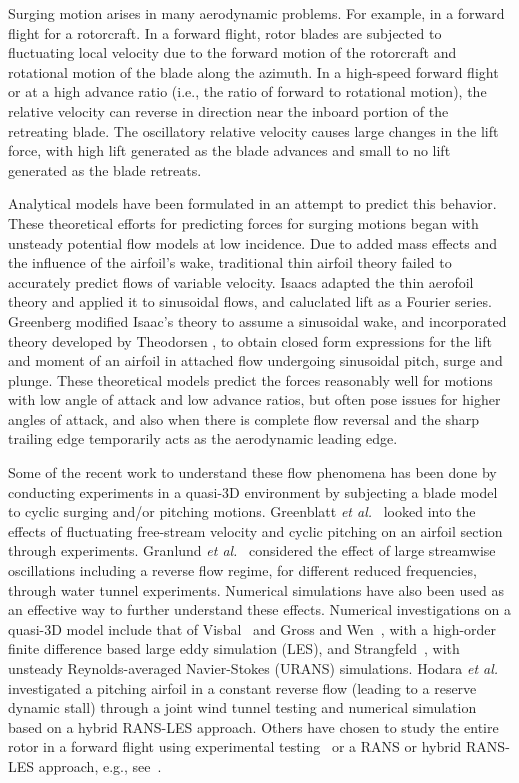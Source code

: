Surging motion arises in many aerodynamic problems.
For example, in a forward flight for a rotorcraft.
In a forward flight, rotor blades are subjected to fluctuating local velocity due to the forward motion of the rotorcraft 
and rotational motion of the blade along the azimuth. 
In a high-speed forward flight or at a high advance ratio (i.e., the ratio of forward to rotational motion), the relative velocity 
can reverse in direction near the inboard portion of the retreating blade.
The oscillatory relative velocity causes large changes in the lift force, with high lift 
generated as the blade advances and small to no lift generated as the blade retreats. 

Analytical models have been formulated in an attempt to predict this behavior. These theoretical efforts for predicting forces for surging motions began with unsteady potential flow models at low incidence. 
Due to added mass effects and the influence of the airfoil’s wake, traditional thin airfoil theory failed to accurately predict flows of variable velocity. 
Isaacs \cite{bib:Isaacs} adapted the thin aerofoil theory and applied it to sinusoidal flows, and caluclated lift as a Fourier series.
Greenberg \cite{bib:Greenberg1947} modified Isaac's theory to assume a sinusoidal wake, and incorporated theory developed by Theodorsen \cite{bib:Theodorsen1934}, to obtain closed form expressions for the lift and moment of an airfoil in attached flow undergoing sinusoidal pitch, surge and plunge. 
These theoretical models predict the forces reasonably well \cite{bib:greenblatt2016} for motions with low angle of attack and low advance ratios, but often pose issues for higher angles of attack, and also when there is complete flow reversal and the sharp trailing edge temporarily acts as the aerodynamic leading edge.

Some of the recent work to understand these flow phenomena has been done by conducting experiments in a quasi-3D environment by subjecting a blade model to cyclic surging and/or pitching motions.
Greenblatt \textit{et al.}~\cite{bib:greenblatt2016} looked into the effects of fluctuating free-stream velocity and cyclic pitching on an airfoil section through experiments.
Granlund \textit{et al.}~\cite{bib:granlund2016} considered the effect of large streamwise oscillations including a reverse flow regime, for different reduced frequencies, through water tunnel experiments.
Numerical simulations have also been used as an effective way to further understand these effects.
Numerical investigations on a quasi-3D model include that of Visbal~\cite{bib:visbal2014} and Gross and Wen~\cite{bib:gross2016}, with a high-order finite difference based large eddy simulation (LES), and Strangfeld~\cite{bib:stangfeld2015unsteady}, with unsteady Reynolds-averaged Navier-Stokes (URANS) simulations.
Hodara \textit{et al.}~\cite{bib:hodara2016} investigated a pitching airfoil in a constant reverse flow (leading to a reserve dynamic stall) through a joint wind tunnel testing and numerical simulation based on a hybrid RANS-LES approach.
Others have chosen to study the entire rotor in a forward flight using experimental testing~\cite{bib:norman2011} or a RANS or hybrid RANS-LES approach, e.g., see~\cite{bib:chaderjian2012detached,bib:potsdam2016}.

